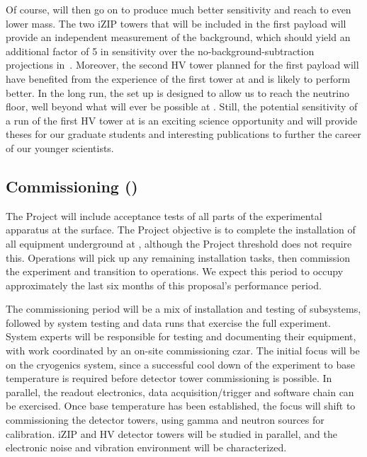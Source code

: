 Of course, \scs will then go on to produce much better sensitivity and reach to even lower mass. The two iZIP towers that will be included in the first \scs payload will provide an independent measurement of the background, which should yield an additional factor of 5 in sensitivity over the no-background-subtraction projections in~\cite{SuperCDMSSensitvitiy:2016arXiv}. Moreover, the second HV tower planned for the first \scs payload will have benefited from the experience of the first tower at \cute and is likely to perform better. In the long run, the \scs set up is designed to allow us to reach the neutrino floor, well beyond what will ever be possible at \cute.
Still, the potential sensitivity of a run of the first HV tower at \cute is an exciting science opportunity and will provide theses for our graduate students and interesting publications to further the career of our younger scientists.

\subsection{\scs Commissioning () }

The \scs Project will include acceptance tests of all parts of the experimental apparatus at the surface. The Project objective is to complete the  installation of all equipment underground at \SNOLAB, although the Project threshold does not require this. \scs Operations will pick up any remaining installation tasks, then commission the experiment and transition to operations. We expect this period to occupy approximately the last six months of this proposal's performance period.

The commissioning period will be a mix of installation and testing of subsystems, followed by system testing and data runs that exercise the full experiment. System experts will be responsible for testing and documenting their equipment, with work coordinated by an on-site commissioning czar. The initial focus will be on the cryogenics system, since a successful cool down of the experiment to base temperature is required before detector tower commissioning is possible. In parallel, the readout electronics, data acquisition/trigger and software chain can be exercised. Once base temperature has been established, the focus will shift to commissioning the detector towers, using gamma and neutron sources for calibration. iZIP and HV detector towers will be studied in parallel, and the electronic noise and vibration environment will be characterized. 

